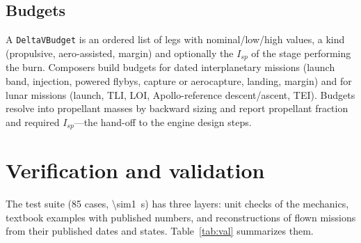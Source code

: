 \documentclass[11pt,a4paper]{article}
\newcommand{\code}[1]{\texttt{#1}}
\begin{document}
\subsection{Budgets}
A \code{DeltaVBudget} is an ordered list of legs with nominal/low/high values, a kind
(propulsive, aero-assisted, margin) and optionally the $I_{sp}$ of the stage performing the
burn. Composers build budgets for dated interplanetary missions (launch band, injection, powered
flybys, capture or aerocapture, landing, margin) and for lunar missions (launch, TLI, LOI,
Apollo-reference descent/ascent, TEI). Budgets resolve into propellant masses by backward
sizing and report propellant fraction and required $I_{sp}$---the hand-off to the engine
design steps.

\section{Verification and validation}\label{sec:val}
The test suite (85 cases, \SI{\sim1}{s}) has three layers: unit checks of the mechanics,
textbook examples with published numbers, and reconstructions of flown missions from their
published dates and states. Table~\ref{tab:val} summarizes them.
\end{document}
